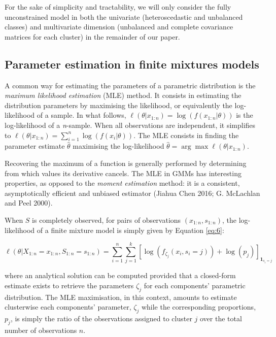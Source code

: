 For the sake of simplicity and tractability, we will only consider the
fully unconstrained model in both the univariate (heteroscedastic and
unbalanced classes) and multivariate dimension (unbalanced and complete
covariance matrices for each cluster) in the remainder of our paper.

\hypertarget{parameter-estimation-in-finite-mixtures-models}{%
\subsection{Parameter estimation in finite mixtures models}\label{parameter-estimation-in-finite-mixtures-models}}

A common way for estimating the parameters of a parametric distribution is
the \emph{maximum likelihood estimation} (MLE) method. It consists in
estimating the distribution parameters by maximising the likelihood, or
equivalently the log-likelihood of a sample. In what follows,
\(\ell(\theta|x_{1:n})=\log (f(x_{1:n}|\theta))\) is the log-likelihood of
a \emph{n}-sample. When all observations are independent, it simplifies to
\(\ell(\theta|x_{1:n}) = \sum_{i=1}^n \log (f(x_i|\theta))\). The MLE
consists in finding the parameter estimate \(\hat{\theta}\) maximising the
log-likelihood \(\hat{\theta} = \arg \max \ell (\theta | x_{1:n})\).

Recovering the maximum of a function is generally performed by
determining from which values its derivative cancels. The MLE in GMMs
has interesting properties, as opposed to the \emph{moment estimation}
method: it is a consistent, asymptotically efficient and unbiased
estimator (Jiahua Chen 2016; G. McLachlan and Peel 2000).

When \(S\) is completely observed, for pairs of observations
\((x_{1:n}, s_{1:n})\), the log-likelihood of a finite mixture model is
simply given by Equation \eqref{eq:6}:

\begin{equation}
\ell(\theta|X_{1:n}=x_{1:n}, S_{1:n}=s_{1:n})=\sum_{i=1}^n \sum_{j=1}^k \left[\log\left(f_{\zeta_j} (x_i, s_i=j)\right) + \log(p_j) \right]_{\mathbf{1}_{s_i=j}}
\label{eq:6}
\end{equation}

where an analytical solution can be computed provided that a closed-form estimate exists to retrieve the parameters \(\zeta_j\) for each components' parametric distribution. The MLE maximisation, in this context, amounts to estimate clusterwise each components' parameter, \(\zeta_j\) while the corresponding proportions, \(p_j\), is simply the ratio of the observations assigned to cluster \(j\) over the total number of observations \(n\).

